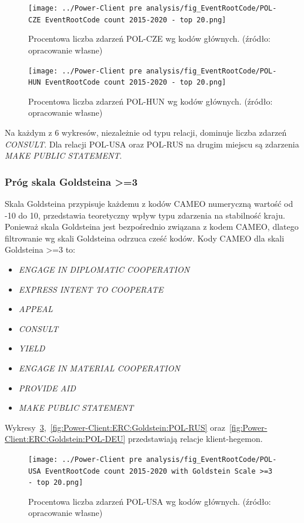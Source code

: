 \documentclass[11pt]{report}
\begin{document}
    \begin{figure}[!htp]
        \centering
        \texttt{[image: ../Power-Client pre analysis/fig\_EventRootCode/POL-CZE EventRootCode count 2015-2020 - top 20.png]}
        \caption{Procentowa liczba zdarzeń POL-CZE wg kodów głównych. (źródło: opracowanie własne)}
        \label{fig:Power-Client:ERC:POL-CZE}
    \end{figure}

    \begin{figure}[!htp]
        \centering
        \texttt{[image: ../Power-Client pre analysis/fig\_EventRootCode/POL-HUN EventRootCode count 2015-2020 - top 20.png]}
        \caption{Procentowa liczba zdarzeń POL-HUN wg kodów głównych. (źródło: opracowanie własne)}
        \label{fig:Power-Client:ERC:POL-HUN}
    \end{figure}

    Na każdym z 6 wykresów, niezależnie od typu relacji, dominuje liczba zdarzeń \textit{CONSULT}.
    Dla relacji POL-USA oraz POL-RUS na drugim miejscu są zdarzenia \textit{MAKE PUBLIC STATEMENT}.

    \subsubsection{Próg skala Goldsteina >=3}
    Skala Goldsteina przypisuje każdemu z kodów CAMEO numeryczną wartość od -10 do 10, przedstawia teoretyczny wpływ typu zdarzenia na stabilność kraju.
    Ponieważ skala Goldsteina jest bezpośrednio związana z kodem CAMEO, dlatego filtrowanie wg skali Goldsteina odrzuca cześć kodów.
    Kody CAMEO dla skali Goldsteina >=3 to:
    \begin{itemize}
        \item \textit{ENGAGE IN DIPLOMATIC COOPERATION}
        \item \textit{EXPRESS INTENT TO COOPERATE}
        \item \textit{APPEAL}
        \item \textit{CONSULT}
        \item \textit{YIELD}
        \item \textit{ENGAGE IN MATERIAL COOPERATION}
        \item \textit{PROVIDE AID}
        \item \textit{MAKE PUBLIC STATEMENT}
    \end{itemize}

    Wykresy~\ref{fig:Power-Client:ERC:Goldstein:POL-USA},~\ref{fig:Power-Client:ERC:Goldstein:POL-RUS} oraz~\ref{fig:Power-Client:ERC:Goldstein:POL-DEU} przedstawiają relacje klient-hegemon.
    \begin{figure}[!htp]
        \centering
        \texttt{[image: ../Power-Client pre analysis/fig\_EventRootCode/POL-USA EventRootCode count 2015-2020 with Goldstein Scale >=3 - top 20.png]}
        \caption{Procentowa liczba zdarzeń POL-USA wg kodów głównych. (źródło: opracowanie własne)}
        \label{fig:Power-Client:ERC:Goldstein:POL-USA}
    \end{figure}
\end{document}
